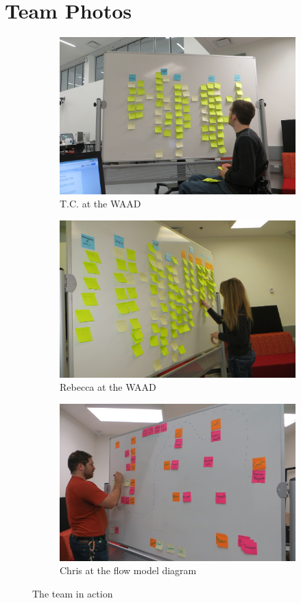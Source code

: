 \documentclass[12pt]{article} %
\begin{document}
\section{Team Photos} %
  \begin{figure}[H]
    \begin{subfigure}{.5\linewidth}
      \centering
      \includegraphics[width=0.95\linewidth]{TeamAtWork1}
      \caption{T.C. at the WAAD}
      \label{fig:team_photo_1}
    \end{subfigure}%
    \begin{subfigure}{.5\linewidth}
      \centering
      \includegraphics[width=0.95\linewidth]{TeamAtWork3}
      \caption{Rebecca at the WAAD}
      \label{fig:team_photo_3}
    \end{subfigure}
    \begin{subfigure}{\linewidth}
      \centering
      \includegraphics[width=0.55\linewidth]{TeamAtWork4}
      \caption{Chris at the flow model diagram}
      \label{fig:team_photo_4}
    \end{subfigure}
    \caption{The team in action}
    \label{fig:test}
  \end{figure}
\end{document}
